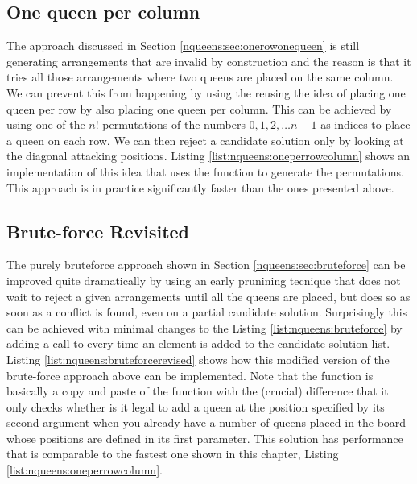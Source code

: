 \subsection{One queen per column}
\label{nqueens:sec:onequeenpercolumn}
The approach discussed in Section \ref{nqueens:sec:onerowonequeen} is still 
generating arrangements that are invalid by construction and the reason is that
it tries all those arrangements where two queens are placed on the same column. 
We can prevent this from happening by using the reusing the idea of placing one queen per row
by also placing one queen per column. This can be achieved by using 
one of the $n!$ permutations of the numbers  $0,1,2,\ldots n-1$ as indices to place a queen on each row.
We can then reject a candidate solution only by looking at the diagonal attacking positions. 
Listing \ref{list:nqueens:oneperrowcolumn} shows an implementation of this idea that uses the 
 function to generate the permutations.
This approach is in practice significantly faster than the ones presented above.





\subsection{Brute-force Revisited}
\label{nqueens:sec:bruteforcerevisited}
The purely bruteforce approach shown in Section \ref{nqueens:sec:bruteforce} can be improved quite dramatically by using an early prunining tecnique that
does not wait to reject a given arrangements until all the queens are placed, but does so as soon as a conflict is found, even on a partial candidate solution.
Surprisingly this can be achieved with minimal changes to the Listing \ref{list:nqueens:bruteforce} by adding a call to 
 every time an element is added to the candidate solution list.
Listing \ref{list:nqueens:bruteforcerevised} shows how this modified version of the brute-force approach above can be implemented.
Note that the function  is basically a copy and paste of the function  with the (crucial)
difference that it only checks whether is it legal to add a queen at the position specified by its second argument when you already have a number of queens placed in the board whose positions are defined in its first parameter.
This solution has performance that is comparable to the fastest one shown in this chapter, Listing \ref{list:nqueens:oneperrowcolumn}.

